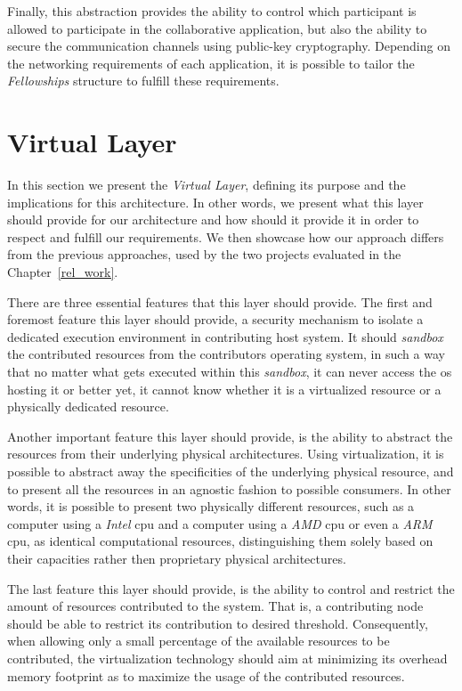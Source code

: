 \documentclass[12pt, titlepage]{uo_temp}
\begin{document}
     Finally, this abstraction provides the ability to control which participant is
     allowed to participate in the collaborative application, but also the ability to
     secure the communication channels using public-key cryptography. Depending on
     the networking requirements of each application, it is possible to tailor the
     \emph{Fellowships} structure to fulfill these requirements.     

     \section{Virtual Layer}
     In this section we present the \emph{Virtual Layer}, defining its purpose and the
     implications for this architecture. In other words, we present what this layer should
     provide for our architecture and how should it provide it in order to respect and
     fulfill our requirements. We then showcase how our approach differs from the previous
     approaches, used by the two projects evaluated in the Chapter~\ref{rel_work}.
     
     There are three essential features that this layer should provide. The first and
     foremost feature this layer should provide, a security mechanism to isolate a
     dedicated execution environment in contributing host system. It should \emph{sandbox}
     the contributed resources from the contributors operating system, in such a way that
     no matter what gets executed within this \emph{sandbox}, it can never access the
     \gls{os} hosting it or better yet, it cannot know whether it is a virtualized
     resource or a physically dedicated resource.
     
     Another important feature this layer should provide, is the ability to abstract the
     resources from their underlying physical architectures. Using virtualization, it is
     possible to abstract away the specificities of the underlying physical resource, and
     to present all the resources in an agnostic fashion to possible consumers. In other
     words, it is possible to present two physically different resources, such as a
     computer using a \emph{Intel} \gls{cpu} and a computer using a \emph{AMD} \gls{cpu}
     or even a \emph{ARM} \gls{cpu}, as identical computational resources, distinguishing
     them solely based on their capacities rather then proprietary physical architectures.
     
     The last feature this layer should provide, is the ability to control and restrict
     the amount of resources contributed to the system. That is, a contributing node
     should be able to restrict its contribution to desired threshold. Consequently, when
     allowing only a small percentage of the available resources to be contributed, the
     virtualization technology should aim at minimizing its overhead memory footprint as
     to maximize the usage of the contributed resources.
     
\end{document}
